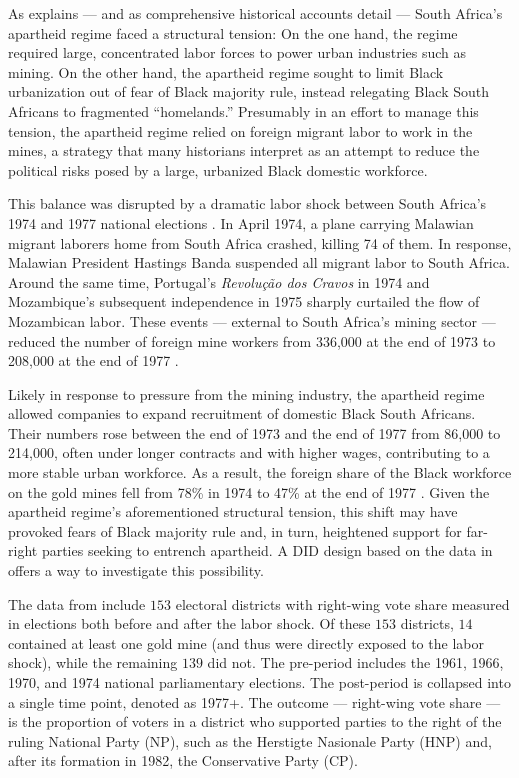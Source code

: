 \documentclass[twoside,11pt]{article}
\begin{document}
As \citet{wilse-samson2013} explains --- and as comprehensive historical accounts detail \citep{dekiewiet1941, thompson1990, welsh2009, dubow2014, omeara1996, feinstein2005} --- South Africa's apartheid regime faced a structural tension: On the one hand, the regime required large, concentrated labor forces to power urban industries such as mining. On the other hand, the apartheid regime sought to limit Black urbanization out of fear of Black majority rule, instead relegating Black South Africans to fragmented ``homelands.'' Presumably in an effort to manage this tension, the apartheid regime relied on foreign migrant labor to work in the mines, a strategy that many historians interpret as an attempt to reduce the political risks posed by a large, urbanized Black domestic workforce.

This balance was disrupted by a dramatic labor shock between South Africa's 1974 and 1977 national elections \citep{crush1993}. In April 1974, a plane carrying Malawian migrant laborers home from South Africa crashed, killing 74 of them. In response, Malawian President Hastings Banda suspended all migrant labor to South Africa. Around the same time, Portugal's \textit{Revolu\c{c}\~ao dos Cravos} in 1974 and Mozambique's subsequent independence in 1975 sharply curtailed the flow of Mozambican labor. These events --- external to South Africa's mining sector --- reduced the number of foreign mine workers from 336{,}000 at the end of 1973 to 208{,}000 at the end of 1977 \citep{wilse-samson2013}.

Likely in response to pressure from the mining industry, the apartheid regime allowed companies to expand recruitment of domestic Black South Africans. Their numbers rose between the end of 1973 and the end of 1977 from 86{,}000 to 214{,}000, often under longer contracts and with higher wages, contributing to a more stable urban workforce. As a result, the foreign share of the Black workforce on the gold mines fell from 78\% in 1974 to 47\% at the end of 1977 \citep[][pp.~8--9]{wilse-samson2013}. Given the apartheid regime's aforementioned structural tension, this shift may have provoked fears of Black majority rule and, in turn, heightened support for far-right parties seeking to entrench apartheid. A DID design based on the data in \citet{wilse-samson2013} offers a way to investigate this possibility.

The data from \citet{wilse-samson2013} include $153$ electoral districts with right-wing vote share measured in elections both before and after the labor shock. Of these $153$ districts, $14$ contained at least one gold mine (and thus were directly exposed to the labor shock), while the remaining $139$ did not. The pre-period includes the 1961, 1966, 1970, and 1974 national parliamentary elections. The post-period is collapsed into a single time point, denoted as 1977+. The outcome --- right-wing vote share --- is the proportion of voters in a district who supported parties to the right of the ruling National Party (NP), such as the Herstigte Nasionale Party (HNP) and, after its formation in 1982, the Conservative Party (CP).
\end{document}
